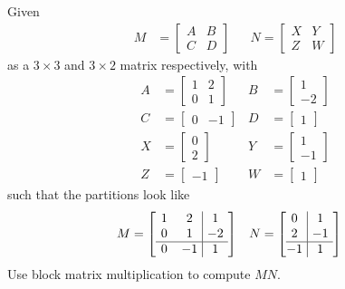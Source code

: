 \begin{exmp}
Given 
\begin{align*}
M &=
\begin{bmatrix}
A & B \\
C & D
\end{bmatrix} 
& &
N =
\begin{bmatrix}
X & Y \\
Z & W
\end{bmatrix} 
\end{align*}
as a $3 \times 3$ and $3 \times 2$ matrix respectively, with
\begin{align*}
A &= 
\begin{bmatrix}
1 & 2 \\
0 & 1
\end{bmatrix}
& 
B &=
\begin{bmatrix}
1 \\
-2
\end{bmatrix} \\
C &= 
\begin{bmatrix}
0 & -1 
\end{bmatrix}
&
D &=
\begin{bmatrix}
1
\end{bmatrix} \\
X &= 
\begin{bmatrix}
0 \\
2 
\end{bmatrix}
&
Y &=
\begin{bmatrix}
1 \\
-1
\end{bmatrix} \\
Z &= 
\begin{bmatrix}
-1
\end{bmatrix}
&
W &=
\begin{bmatrix}
1
\end{bmatrix} 
\end{align*}
such that the partitions look like
\begin{align*}
M &=
\left[\begin{array}{@{\,}wc{10pt}wc{10pt}|wc{10pt}}
1 & 2 & 1 \\
0 & 1 & -2 \\
\hline
0 & -1 & 1
\end{array}\right]
& &
N =
\left[\begin{array}{@{\,}wc{10pt}|wc{10pt}}
0 & 1 \\
2 & -1 \\
\hline
-1 & 1
\end{array}\right]   
\end{align*}
Use block matrix multiplication to compute $MN$.
\end{exmp}
